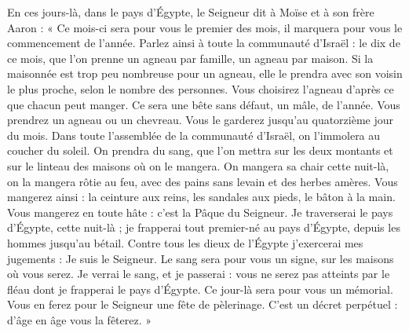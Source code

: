 En ces jours-là, dans le pays d’Égypte,
le Seigneur dit à Moïse et à son frère Aaron :
« Ce mois-ci
sera pour vous le premier des mois,
il marquera pour vous le commencement de l’année.
Parlez ainsi à toute la communauté d’Israël :
le dix de ce mois,
que l’on prenne un agneau par famille,
un agneau par maison.
Si la maisonnée est trop peu nombreuse pour un agneau,
elle le prendra avec son voisin le plus proche,
selon le nombre des personnes.
Vous choisirez l’agneau d’après ce que chacun peut manger.
Ce sera une bête sans défaut, un mâle, de l’année.
Vous prendrez un agneau ou un chevreau.
Vous le garderez jusqu’au quatorzième jour du mois.
Dans toute l’assemblée de la communauté d’Israël,
on l’immolera au coucher du soleil.
On prendra du sang,
que l’on mettra sur les deux montants et sur le linteau
des maisons où on le mangera.
On mangera sa chair cette nuit-là,
on la mangera rôtie au feu,
avec des pains sans levain et des herbes amères.
Vous mangerez ainsi : la ceinture aux reins,
les sandales aux pieds,
le bâton à la main.
Vous mangerez en toute hâte :
c’est la Pâque du Seigneur.
Je traverserai le pays d’Égypte, cette nuit-là ;
je frapperai tout premier-né au pays d’Égypte,
depuis les hommes jusqu’au bétail.
Contre tous les dieux de l’Égypte j’exercerai mes jugements :
Je suis le Seigneur.
Le sang sera pour vous un signe,
sur les maisons où vous serez.
Je verrai le sang, et je passerai :
vous ne serez pas atteints par le fléau
dont je frapperai le pays d’Égypte.
Ce jour-là
sera pour vous un mémorial.
Vous en ferez pour le Seigneur une fête de pèlerinage.
C’est un décret perpétuel : d’âge en âge vous la fêterez. »